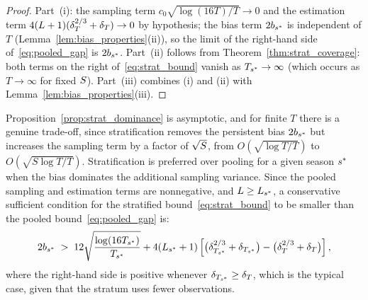 \begin{proof}
  Part~(i): the sampling term
  $c_0\sqrt{\log(16T)/T} \to 0$ and the estimation term
  $4(L+1)(\delta_T^{2/3}+\delta_T) \to 0$ by hypothesis; the bias
  term $2b_{s^*}$ is independent of $T$
  (Lemma~\ref{lem:bias_properties}(ii)), so the limit of the
  right-hand side of~\eqref{eq:pooled_gap} is $2b_{s^*}$.
  Part~(ii) follows from Theorem~\ref{thm:strat_coverage}: both
  terms on the right of~\eqref{eq:strat_bound} vanish as
  $T_{s^*} \to \infty$ (which occurs as $T\to\infty$ for fixed $S$).
  Part~(iii) combines (i) and (ii) with
  Lemma~\ref{lem:bias_properties}(iii).
\end{proof}

Proposition~\ref{prop:strat_dominance} is asymptotic, and for finite
$T$ there is a genuine trade-off, since stratification removes the
persistent bias $2b_{s^*}$ but increases the sampling term by a
factor of $\sqrt{S}$, from $O(\sqrt{\log T / T})$ to
$O(\sqrt{S\log T / T})$.  Stratification is preferred over pooling
for a given season $s^*$ when the bias dominates the additional
sampling variance.  Since the pooled sampling and estimation terms
are nonnegative, and $L \geq L_{s^*}$, a conservative sufficient
condition for the stratified bound~\eqref{eq:strat_bound} to be
smaller than the pooled bound~\eqref{eq:pooled_gap} is:
\begin{equation}
  \label{eq:dominance_condition}
  2b_{s^*} \;>\;
  12\sqrt{\frac{\log(16T_{s^*})}{T_{s^*}}}
  + 4(L_{s^*}+1)
  \left[\bigl(\delta_{T_{s^*}}^{2/3} + \delta_{T_{s^*}}\bigr)
        - \bigl(\delta_T^{2/3} + \delta_T\bigr)\right],
\end{equation}
where the right-hand side is positive whenever
$\delta_{T_{s^*}} \geq \delta_T$, which is the typical case, given that the
stratum uses fewer observations.

